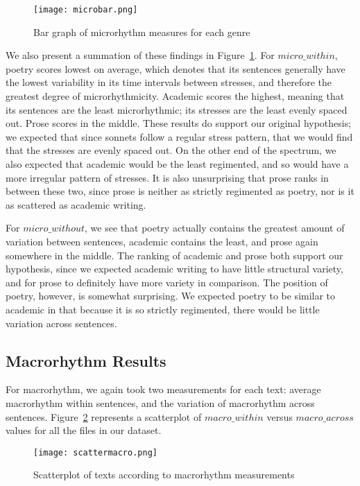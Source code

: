 \documentclass[pageno]{jpaper}
\begin{document}
\begin{figure}[hbt]
\centering
\texttt{[image: microbar.png]}
\caption{Bar graph of microrhythm measures for each genre}
\label{fig:microbar}
\end{figure}

We also present a summation of these findings in Figure~\ref{fig:microbar}. For $micro\_within$, poetry scores lowest on average, which denotes that its sentences generally have the lowest variability in its time intervals between stresses, and therefore the greatest degree of microrhythmicity. Academic scores the highest, meaning that its sentences are the least microrhythmic; its stresses are the least evenly spaced out. Prose scores in the middle. These results do support our original hypothesis; we expected that since sonnets follow a regular stress pattern, that we would find that the stresses are evenly spaced out. On the other end of the spectrum, we also expected that academic would be the least regimented, and so would have a more irregular pattern of stresses. It is also unsurprising that prose ranks in between these two, since prose is neither as strictly regimented as poetry, nor is it as scattered as academic writing.

For $micro\_without$, we see that poetry actually contains the greatest amount of variation between sentences, academic contains the least, and prose again somewhere in the middle. The ranking of academic and prose both support our hypothesis, since we expected academic writing to have little structural variety, and for prose to definitely have more variety in comparison. The position of poetry, however, is somewhat surprising. We expected poetry to be similar to academic in that because it is so strictly regimented, there would be little variation across sentences.

\subsection{Macrorhythm Results}
For macrorhythm, we again took two measurements for each text: average macrorhythm within sentences, and the variation of macrorhythm across sentences. Figure~\ref{fig:scattermacro} represents a scatterplot of $macro\_within$ versus $macro\_across$ values for all the files in our dataset. 

\begin{figure}[hbt]
\centering
\texttt{[image: scattermacro.png]}
\caption{Scatterplot of texts according to macrorhythm measurements}
\label{fig:scattermacro}
\end{figure}
\end{document}
